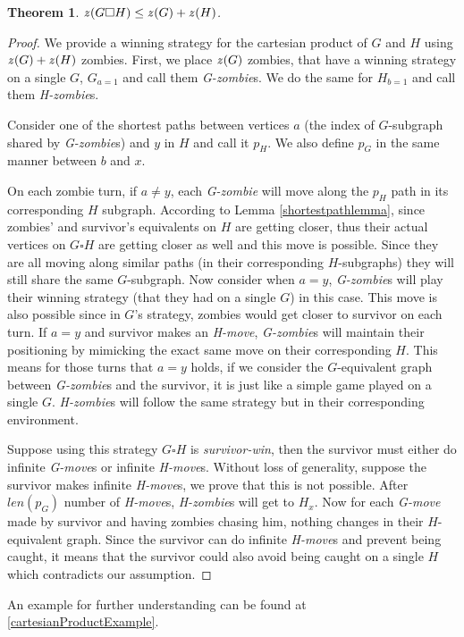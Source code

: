\documentclass[1p]{elsarticle}
\newtheorem{theorem}{Theorem}
\newcommand{\zn}{\ooalign{$z$\cr\hfil\rule[.5ex]{.2em}{.08ex}\hfil\cr}}
\begin{document}
\begin{theorem}
	\label{T2}
	$\zn(G \square H) \leq \zn(G) + \zn(H)$.
\end{theorem}

\begin{proof}
	We provide a winning strategy for the cartesian product of $G$ and $H$ using $\zn(G)+\zn(H)$ zombies. First, we place
	$\zn(G)$ zombies, that have a winning strategy on a single $G$, $G_{a = 1}$ and call them {\it G-zombie}s. We do the
	same for $H_{b = 1}$ and call them {\it H-zombie}s.


	Consider one of the shortest paths between vertices $a$ (the index of $G$-subgraph shared by {\it G-zombie}s) and
	$y$ in $H$ and call it $p_H$. We also define $p_G$ in the same manner between $b$ and $x$.


	On each zombie turn, if $a \neq y$, each {\it G-zombie} will move along the $p_H$ path in its corresponding $H$
	subgraph. According to Lemma \ref{shortestpathlemma}, since zombies' and survivor's equivalents on $H$ are getting
	closer, thus their actual vertices on $G \square H$ are getting closer as well and this move is possible. Since they
	are all moving along similar paths (in their corresponding $H$-subgraphs) they will still share the same
	$G$-subgraph. Now consider when $a = y$, {\it G-zombie}s will play their winning strategy (that they had on a single
	$G$) in this case. This move is also possible since in $G$'s strategy, zombies would get closer to survivor on each
	turn. If $a = y$ and survivor makes an {\it H-move}, {\it G-zombie}s will maintain their positioning by mimicking
	the exact same move on their corresponding $H$. This means for those turns that $a=y$ holds, if we consider the
	$G$-equivalent graph between {\it G-zombie}s and the survivor, it is just like a simple game played on a single $G$.
	{\it H-zombie}s will follow the same strategy but in their corresponding environment.
	
	
	Suppose using this strategy $G \square H$ is {\it survivor-win}, then the survivor must either do infinite {\it
	G-move}s or infinite {\it H-move}s. Without loss of generality, suppose the survivor makes infinite {\it H-move}s,
	we prove that this is not possible. After $len(p_G)$ number of {\it H-move}s, {\it H-zombie}s will get to $H_x$. Now
	for each {\it G-move} made by survivor and having zombies chasing him, nothing changes in their $H$-equivalent
	graph. Since the survivor can do infinite {\it H-move}s and prevent being caught, it means that the survivor could
	also avoid being caught on a single $H$ which contradicts our assumption.
	
\end{proof}
An example for further understanding can be found at \ref{cartesianProductExample}.
\end{document}
